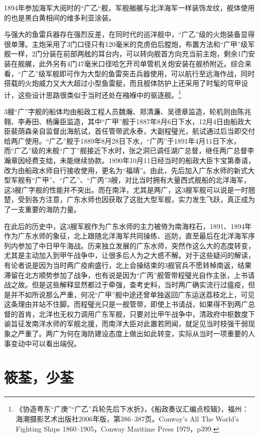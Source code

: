 \documentclass[12pt,UTF8]{ctexbook}
\begin{document}
1894年参加海军大阅时的“广乙“舰，军舰艏艉与北洋海军一样装饰龙纹，舰体使用的也是黑白黄相间的维多利亚涂装。

与强大的鱼雷兵器存在强烈反差，在同时代的巡洋舰中，“广乙”级的火炮装备显得很单薄。主炮采用了3门口径只有120毫米的克虏伯后膛炮，布置方法和“广甲”级军舰一样，2门分装在前部两舷的耳台内，可以转向舰首方向充当前主炮，剩余1门安装在舰艉，此外另有4门47毫米口径哈乞开司单管机关炮安装在舰桥附近。综合来看，“广乙”级军舰即可作为大型的鱼雷突击兵器使用，可以航行至远海作战，同时搭载的火炮威力又大大超过小型鱼雷艇，而且舰体防护上还采用了时髦的穹甲设计，这些设计思路很类似于当时还处在襁褓中的驱逐舰。\footnote{《协造粤东“广庚”“广乙”兵轮先后下水折》，《船政奏议汇编点校辑》，福州：海潮摄影艺术出版社2006年版，第386--387页。Conway's All The World's Fighting Ships 1860--1905，Conway Maritime Press 1979，p399.}

3艘“广”字舰的船体均由船政工程人员魏瀚、郑清濂、吴德章监造，轮机则由陈兆翱、李寿田、杨廉臣监造，其中“广甲”舰于1887年8月6日下水，12月4日由船政大臣裴荫森亲自监督出海航试，首任管带武永泰，大副程璧光，航试通过后当即交付给两广使用。“广乙”舰于1889年8月28日下水，“广丙”于1891年4月11日下水，而“广乙”级的末舰“广丁”舰接近下水时，张之洞已调任湖广总督，继任两广总督李瀚章因经费支绌，未能继续协款。1890年10月11日经当时的船政大臣卞宝第奏请，改为由船政水师自行接收使用，更名为“福靖”。由此，先后加入广东水师的新式大型军舰有“广甲”、“广乙”、“广丙”3艘，对比当时拥有大量西式舰船的北洋海军，这3艘广字舰的性能并不突出。而在南洋，尤其是两广，这3艘军舰可以说是一时翘楚，受到各方注意，广东水师也因获取了这批大型军舰，实力发生飞跃，真正成为了一支重要的海防力量。

在此后的历史中，这3艘军舰作为广东水师的主力被倚为南海柱石，1891、1894年作为广东水师的象征，北上跟随北洋海军共同操练、巡防，直至最后在北洋海军序列内参加了中日甲午海战。历来独立发展的广东水师，突然作这么大的态度转变，尤其是主动加入到甲午战争中，让很多后人为之大惑不解。对于这些疑问的解读，有论者说是因为当时两广疫痢盛行，北上会操结束的3舰官兵不愿转棹南返，结果滞留在北方顺势参加了战争，也有说是因为“广丙”舰管带程璧光自作主张，上书请战之故。但是这些解释显然都过于牵强，查考史料，当时两广确实流行过瘟疫，但是并不如所说那么严重，何况“广甲”舰中途还曾单独返回广东运送荔枝北上，可见这条理由并站不住脚。而程璧光只是一舰管带，即使上书请战，如果得不到两广总督的首肯，北洋也无权力调用广东军舰，只要对比甲午战争中，清政府中枢数度下谕旨征发南洋水师的军舰北援，而南洋大臣对此置若罔闻，就足见当时枝强干弱现象之严重了。两广为何在海防建设态度上做出如此转变，实际从当时一项重要的人事变动中可以看出端倪。

\section{筱荃，少荃}
\end{document}
